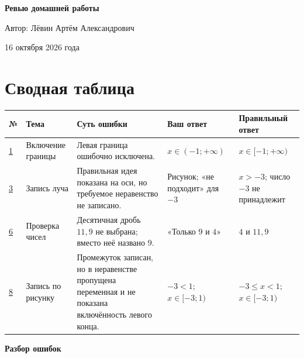 \documentclass[12pt,a4paper]{article}
\begin{document}
\thispagestyle{empty}
\begin{center}
\vspace*{0.28\textheight}
{\huge\bfseries Ревью домашней работы\par}
\vspace{22mm}
{\large Автор: Лёвин Артём Александрович\par}
\vspace{5mm}
{\large 16 октября 2026 года\par}
\vfill
{}
\vspace{12mm}
\end{center}
\newpage

\section*{Сводная таблица}
\small
\setlength{\tabcolsep}{3pt}
\begin{longtable}{@{}p{1.25cm}p{2.45cm}p{4.15cm}p{4.05cm}p{4.0cm}@{}}
\toprule
\textbf{№} & \textbf{Тема} & \textbf{Суть ошибки} & \textbf{Ваш ответ} & \textbf{Правильный ответ}\\
\midrule
\endhead
\hyperref[task:1]{1} & Включение границы & Левая граница ошибочно исключена. & $x\in(-1;+\infty)$ & $x\in[-1;+\infty)$\\
\addlinespace[3pt]
\hyperref[task:3]{3} & Запись луча & Правильная идея показана на оси, но требуемое неравенство не записано. & Рисунок; «не подходит» для $-3$ & $x>-3$; число $-3$ не принадлежит\\
\addlinespace[3pt]
\hyperref[task:6]{6} & Проверка чисел & Десятичная дробь $11{,}9$ не выбрана; вместо неё названо $9$. & «Только $9$ и $4$» & $4$ и $11{,}9$\\
\addlinespace[3pt]
\hyperref[task:8]{8} & Запись по рисунку & Промежуток записан, но в неравенстве пропущена переменная и не показана включённость левого конца. & $-3<1$; $x\in[-3;1)$ & $-3\le x<1$; $x\in[-3;1)$\\
\bottomrule
\end{longtable}
\normalsize
\newpage

\thispagestyle{empty}
\vspace*{\fill}
\begin{center}
{\LARGE\bfseries Разбор ошибок}
\end{center}
\vspace*{\fill}
\newpage
\end{document}
